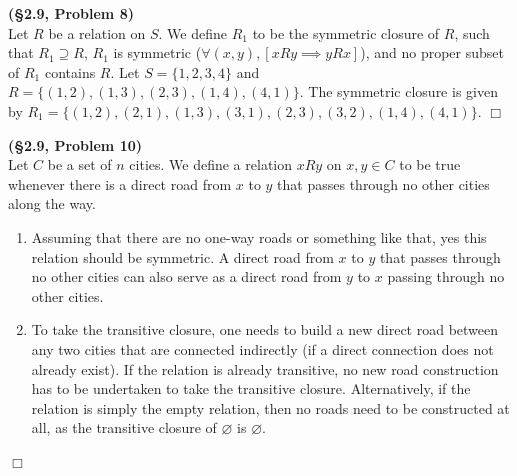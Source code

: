 \documentclass[12pt]{article}
\theoremstyle{definition}
\newenvironment{Solution}{\noindent {\sc Solution.}}{$\Box$ \vspace{2 ex}}
\begin{document}
\vspace{0.5cm}

\begin{Solution}
{\bf (\S2.9, Problem 8)}\\
Let $R$ be a relation on $S$. We define $R_1$ to be the symmetric closure of $R$, such that $R_1 \supseteq R$, $R_1$ is symmetric ($\forall (x,y),[xRy\implies yRx]$), and no proper subset of $R_1$ contains $R$. Let $S=\{1,2,3,4\}$ and $R=\{(1,2),(1,3),(2,3),(1,4),(4,1)\}$. The symmetric closure is given by
$R_1 =\{(1,2),(2,1),(1,3),(3,1),(2,3),(3,2),(1,4),(4,1)\}.$
\end{Solution}

\vspace{0.5cm}

\begin{Solution}
{\bf (\S2.9, Problem 10)}\\
Let $C$ be a set of $n$ cities. We define a relation $xRy$ on $x,y\in C$ to be true whenever there is a direct road from $x$ to $y$ that passes through no other cities along the way.

\begin{enumerate}
    \item Assuming that there are no one-way roads or something like that, yes this relation should be symmetric. A direct road from $x$ to $y$ that passes through no other cities can also serve as a direct road from $y$ to $x$ passing through no other cities.
    \item To take the transitive closure, one needs to build a new direct road between any two cities that are connected indirectly (if a direct connection does not already exist). If the relation is already transitive, no new road construction has to be undertaken to take the transitive closure. Alternatively, if the relation is simply the empty relation, then no roads need to be constructed at all, as the transitive closure of $\varnothing$ is $\varnothing$.
\end{enumerate}
\end{Solution}

\vspace{0.5cm}
\end{document}
